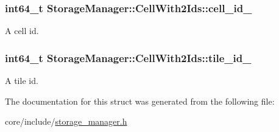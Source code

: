 \subsubsection[{cell\+\_\+id\+\_\+}]{\setlength{\rightskip}{0pt plus 5cm}int64\+\_\+t Storage\+Manager\+::\+Cell\+With2\+Ids\+::cell\+\_\+id\+\_\+}\label{structStorageManager_1_1CellWith2Ids_a93c3a34f73ae7e7b421a1be1e993a3db}
A cell id. \hypertarget{structStorageManager_1_1CellWith2Ids_aba82daca6b6c2257ae7fa6e67fcc79d9}{}
\subsubsection[{tile\+\_\+id\+\_\+}]{\setlength{\rightskip}{0pt plus 5cm}int64\+\_\+t Storage\+Manager\+::\+Cell\+With2\+Ids\+::tile\+\_\+id\+\_\+}\label{structStorageManager_1_1CellWith2Ids_aba82daca6b6c2257ae7fa6e67fcc79d9}
A tile id. 

The documentation for this struct was generated from the following file\+:\begin{DoxyCompactItemize}
\item 
core/include/\hyperlink{storage__manager_8h}{storage\+\_\+manager.\+h}\end{DoxyCompactItemize}
